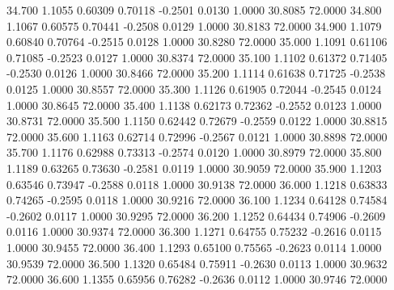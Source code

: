   34.700   1.1055   0.60309   0.70118  -0.2501   0.0130   1.0000  30.8085  72.0000
  34.800   1.1067   0.60575   0.70441  -0.2508   0.0129   1.0000  30.8183  72.0000
  34.900   1.1079   0.60840   0.70764  -0.2515   0.0128   1.0000  30.8280  72.0000
  35.000   1.1091   0.61106   0.71085  -0.2523   0.0127   1.0000  30.8374  72.0000
  35.100   1.1102   0.61372   0.71405  -0.2530   0.0126   1.0000  30.8466  72.0000
  35.200   1.1114   0.61638   0.71725  -0.2538   0.0125   1.0000  30.8557  72.0000
  35.300   1.1126   0.61905   0.72044  -0.2545   0.0124   1.0000  30.8645  72.0000
  35.400   1.1138   0.62173   0.72362  -0.2552   0.0123   1.0000  30.8731  72.0000
  35.500   1.1150   0.62442   0.72679  -0.2559   0.0122   1.0000  30.8815  72.0000
  35.600   1.1163   0.62714   0.72996  -0.2567   0.0121   1.0000  30.8898  72.0000
  35.700   1.1176   0.62988   0.73313  -0.2574   0.0120   1.0000  30.8979  72.0000
  35.800   1.1189   0.63265   0.73630  -0.2581   0.0119   1.0000  30.9059  72.0000
  35.900   1.1203   0.63546   0.73947  -0.2588   0.0118   1.0000  30.9138  72.0000
  36.000   1.1218   0.63833   0.74265  -0.2595   0.0118   1.0000  30.9216  72.0000
  36.100   1.1234   0.64128   0.74584  -0.2602   0.0117   1.0000  30.9295  72.0000
  36.200   1.1252   0.64434   0.74906  -0.2609   0.0116   1.0000  30.9374  72.0000
  36.300   1.1271   0.64755   0.75232  -0.2616   0.0115   1.0000  30.9455  72.0000
  36.400   1.1293   0.65100   0.75565  -0.2623   0.0114   1.0000  30.9539  72.0000
  36.500   1.1320   0.65484   0.75911  -0.2630   0.0113   1.0000  30.9632  72.0000
  36.600   1.1355   0.65956   0.76282  -0.2636   0.0112   1.0000  30.9746  72.0000
